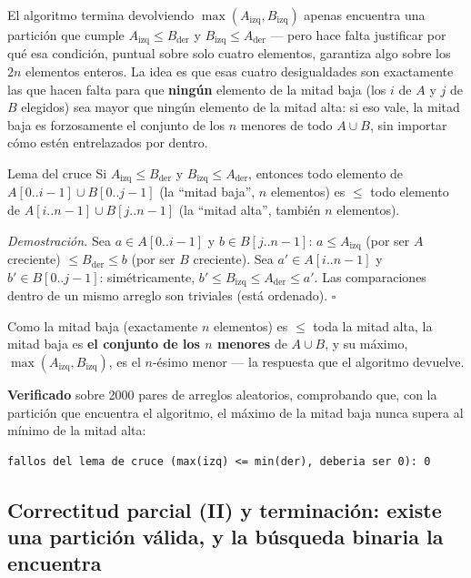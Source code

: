 \documentclass[11pt]{article}
\begin{document}
El algoritmo termina devolviendo $\max(A_{\mathrm{izq}},B_{\mathrm{izq}})$ apenas encuentra una partición que
cumple $A_{\mathrm{izq}}\le B_{\mathrm{der}}$ y $B_{\mathrm{izq}}\le A_{\mathrm{der}}$ --- pero hace falta
justificar por qué esa condición, puntual sobre solo cuatro elementos, garantiza algo sobre los $2n$
elementos enteros. La idea es que esas cuatro desigualdades son exactamente las que hacen falta para que
\textbf{ningún} elemento de la mitad baja (los $i$ de $A$ y $j$ de $B$ elegidos) sea mayor que ningún
elemento de la mitad alta: si eso vale, la mitad baja es forzosamente el conjunto de los $n$ menores de todo
$A\cup B$, sin importar cómo estén entrelazados por dentro.

\begin{resultado}{Lema del cruce}
Si $A_{\mathrm{izq}}\le B_{\mathrm{der}}$ y $B_{\mathrm{izq}}\le A_{\mathrm{der}}$, entonces todo elemento
de $A[0..i{-}1]\cup B[0..j{-}1]$ (la ``mitad baja'', $n$ elementos) es $\le$ todo elemento de
$A[i..n{-}1]\cup B[j..n{-}1]$ (la ``mitad alta'', también $n$ elementos).
\end{resultado}

\textit{Demostración.} Sea $a\in A[0..i{-}1]$ y $b\in B[j..n{-}1]$: $a\le A_{\mathrm{izq}}$ (por ser $A$
creciente) $\le B_{\mathrm{der}}\le b$ (por ser $B$ creciente). Sea $a'\in A[i..n{-}1]$ y
$b'\in B[0..j{-}1]$: simétricamente, $b'\le B_{\mathrm{izq}}\le A_{\mathrm{der}}\le a'$. Las comparaciones
dentro de un mismo arreglo son triviales (está ordenado). $\square$

Como la mitad baja (exactamente $n$ elementos) es $\le$ toda la mitad alta, la mitad baja es \textbf{el
conjunto de los $n$ menores} de $A\cup B$, y su máximo, $\max(A_{\mathrm{izq}},B_{\mathrm{izq}})$, es el
$n$-ésimo menor --- la respuesta que el algoritmo devuelve.

\textbf{Verificado} sobre 2000 pares de arreglos aleatorios, comprobando que, con la partición que encuentra
el algoritmo, el máximo de la mitad baja nunca supera al mínimo de la mitad alta:
\begin{lstlisting}[style=salida]
fallos del lema de cruce (max(izq) <= min(der), deberia ser 0): 0
\end{lstlisting}

\subsection*{Correctitud parcial (II) y terminación: existe una partición válida, y la búsqueda binaria la
encuentra}
\end{document}
